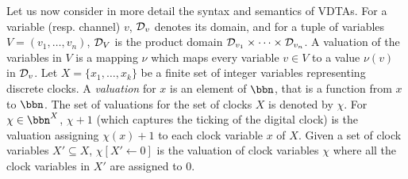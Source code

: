 Let us now consider in more detail the syntax and semantics of VDTAs.
%
For a variable (resp. channel) $v$, ${\cal D}_v$ denotes its domain,
and for a tuple of variables $V= (v_1, \ldots, v_n)$,
${\cal D}_V$ is the product domain ${\cal D}_{v_1} \times \cdots \times {\cal D}_{v_n}$.
A valuation of the variables in $V$
is a mapping $\nu$ which maps every variable $v \in V$ to a value $\nu(v)$ in ${\cal D}_v$.
%
Let $X=\{x_1,\ldots, x_k\}$ be a finite set of integer variables representing discrete clocks.
%
A {\em valuation} for $x$ is an element of $\bbn$, that is a function from $x$ to $\bbn$.
The set of valuations for the set of clocks $X$ is denoted by $\chi$.
%
For $\chi\in\bbn^X$, $\chi+1$ (which captures the ticking of the digital clock) is the valuation assigning $\chi(x)+1$ to each clock variable $x$ of $X$.
Given a set of clock variables $X' \subseteq X$, $\chi[X' \leftarrow 0]$ is the valuation of clock variables $\chi$ where all the clock variables in $X'$ are assigned to $0$.



